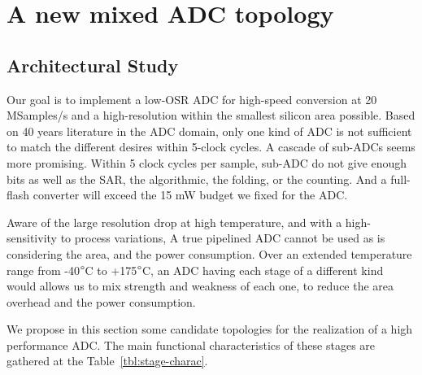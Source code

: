 \chapter{A new mixed ADC topology}
\label{sec:adc-implementation}

\ifpdf 
    \graphicspath{{Chapter4/Figs/Raster/}{Chapter4/Figs/PDF/}{Chapter4/Figs/}}
\else
    \graphicspath{{Chapter4/Figs/Vector/}{Chapter4/Figs/}}
\fi

\section{Architectural Study}
Our goal is to implement a low-OSR ADC for high-speed conversion at 20 MSamples/s and a high-resolution within the smallest silicon area possible. Based on 40 years literature in the ADC domain, only one kind of ADC is not sufficient to match the different desires within 5-clock cycles. A cascade of sub-ADCs seems more promising. Within 5 clock cycles per sample, sub-ADC do not give enough bits as well as the SAR, the algorithmic, the folding, or the counting. And a full-
flash converter will exceed the 15 mW budget we fixed for the ADC\@.

Aware of the large resolution drop at high temperature, and with a high-sensitivity to process variations, A true pipelined ADC cannot be used as is considering the area, and the power consumption. Over an extended temperature range from -40\(\degree \)C to +175\(\degree \)C, an ADC having each stage of a different kind would allows us to mix strength and weakness of each one, to reduce the area overhead and the power consumption.

We propose in this section some candidate topologies for the realization of a high performance ADC\@. The main functional characteristics of these stages are gathered at the Table~\ref{tbl:stage-charac}.

